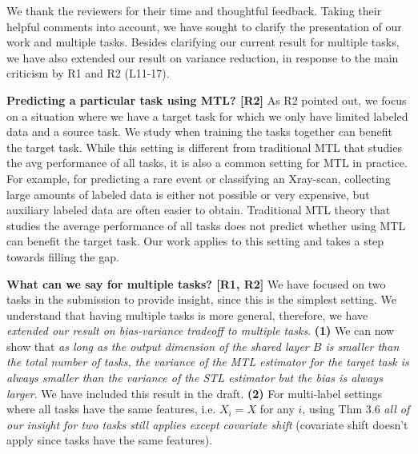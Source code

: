\documentclass{article}
\begin{document}
We thank the reviewers for their time and thoughtful feedback.
Taking their helpful comments into account, we have sought to clarify the presentation of our work and  multiple tasks. %
Besides clarifying our current result for multiple tasks, we have also extended our result on variance reduction, in response to the main criticism by R1 and R2 (L11-17).


\vspace{-0.025in}
\textbf{Predicting a particular task using MTL? [R2]}
As R2 pointed out, we focus on a situation where we have a target task for which we only have limited labeled data and a source task.
We study when training the tasks together can benefit the target task.
While this setting is different from traditional MTL that studies the avg performance of all tasks, it is also a common setting for MTL in practice.
For example, for predicting a rare event or classifying an Xray-scan, collecting large amounts of labeled data is either not possible or very expensive, but auxiliary labeled data are often easier to obtain.
Traditional MTL theory that studies the average performance of all tasks does not predict whether using MTL can benefit the target task.
Our work applies to this setting and takes a step towards filling the gap.


\vspace{-0.025in}
\textbf{What can we say for multiple tasks? [R1, R2]}
We have focused on two tasks in the submission to provide insight, since this is the simplest setting.
We understand that having multiple tasks is more general, therefore, we have \textit{extended our result on bias-variance tradeoff to multiple tasks}.
\textbf{(1)} We can now show that \textit{as long as the output dimension of the shared layer $B$ is smaller than the total number of tasks, the variance of the MTL estimator for the target task is always smaller than the variance of the STL estimator but the bias is always larger}.
We have included this result in the draft.
\textbf{(2)} For multi-label settings where all tasks have the same features, i.e. $X_i = X$ for any $i$, using Thm 3.6 \textit{all of our insight for two tasks still applies except covariate shift} (covariate shift doesn't apply since tasks have the same features).
\end{document}
